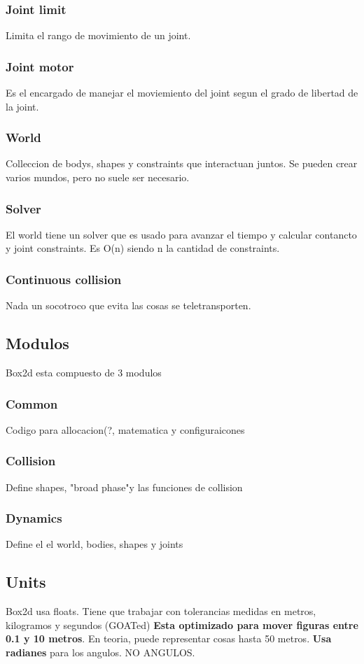 \documentclass[11pt]{article}
\begin{document}
\subsubsection{Joint limit}
\label{sec:org5cf9a4a}
Limita el rango de movimiento de un joint. 
\subsubsection{Joint motor}
\label{sec:org440d5bd}
Es el encargado de manejar el moviemiento del joint segun el grado de libertad de la joint. 
\subsubsection{World}
\label{sec:orga65d599}
Colleccion de bodys, shapes y constraints que interactuan juntos. 
Se pueden crear varios mundos, pero no suele ser necesario.
\subsubsection{Solver}
\label{sec:org039840f}
El world tiene un solver que es usado para avanzar el tiempo y calcular contancto y joint constraints.
Es O(n) siendo n la cantidad de constraints.
\subsubsection{Continuous collision}
\label{sec:orgde71ed0}
Nada un socotroco que evita las cosas se teletransporten.
\subsection{Modulos}
\label{sec:org78f2375}
Box2d esta compuesto de 3 modulos
\subsubsection{Common}
\label{sec:org0bf3425}
Codigo para allocacion(?, matematica y configuraicones
\subsubsection{Collision}
\label{sec:orgcc6cf99}
Define shapes, "broad phase"y las funciones de collision
\subsubsection{Dynamics}
\label{sec:org09e00be}
Define el el world, bodies, shapes y joints
\subsection{Units}
\label{sec:orgc31b0c7}
Box2d usa floats.
Tiene que trabajar con tolerancias medidas en metros, kilogramos y segundos (GOATed)
\textbf{Esta optimizado para mover figuras entre 0.1 y 10 metros}.
En teoria, puede representar cosas hasta 50 metros.
\textbf{Usa radianes} para los angulos. NO ANGULOS.
\end{document}
